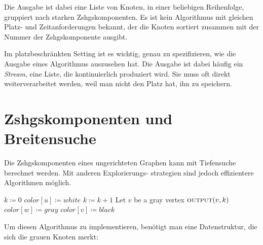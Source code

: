 \documentclass{cheat-sheet}
\begin{document}
\begin{bem}
  Die Ausgabe ist dabei eine Liste von Knoten, in einer beliebigen Reihenfolge, gruppiert nach starken Zshgskomponenten.
  Es ist kein Algorithmus mit gleichen Platz- und Zeitanforderungen bekannt, der die Knoten sortiert zusammen mit der Nummer der Zshgskomponente ausgibt.
\end{bem}


\begin{folgerung}
  Im platzbeschränkten Setting ist es wichtig, genau zu spezifizieren, wie die Ausgabe eines Algorithmus auszusehen hat.
  Die Ausgabe ist dabei häufig ein \textit{Stream}, eine Liste, die kontinuierlich produziert wird.
  Sie muss oft direkt weiterverarbeitet werden, weil man nicht den Platz hat, ihn zu speichern.
\end{folgerung}

\section{Zshgskomponenten und Breitensuche}

\begin{bem}
  Die Zshgskomponenten eines ungerichteten Graphen kann mit Tiefensuche berechnet werden.
  Mit anderen Explorierungs- strategien sind jedoch effizientere Algorithmen möglich.
\end{bem}

\begin{alg} \mbox{}
  \begin{algorithmic}[1]
      \State $k \coloneqq 0$
        \State $color[u] \coloneqq white$ \EndFor
          \State \Continue
        \EndIf
        \State $k \coloneqq k + 1$
          \State Let $v$ be a gray vertex
          \State $\Call{output}{v, k}$
              \State $color[w] \coloneqq gray$
            \EndIf
            \State $color[v] \coloneqq black$
          \EndFor
        \EndWhile
      \EndFor
    \EndFunction
  \end{algorithmic}
\end{alg}

\begin{bem}
  Um diesen Algorithmus zu implementieren, benötigt man eine Datenstruktur, die sich die grauen Knoten merkt:
\end{bem}
\end{document}
